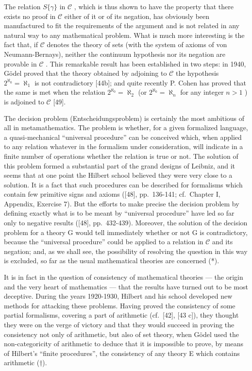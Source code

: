 The relation \(S\{\gamma\}\) in \(\mathcal{C}\) , which is thus shown to have the property that there exists no proof in \(\mathcal{C}\) either of it or of its negation, has obviously been manufactured to fit the requirements of the argument and is not related in any natural way to any mathematical problem. What is much more interesting is the fact that, if \(\mathcal{C}\) denotes the theory of sets (with the system of axioms of von Neumann-Bernays), neither the continuum hypothesis nor its negation are provable in \(\mathcal{C}\) . This remarkable result has been established in two steps: in 1940, Gödel proved that the theory obtained by adjoining to \(\mathcal{C}\) the hypothesis \(2^{\aleph_0} = \aleph_1\) is not contradictory {[}44b{]}; and quite recently P. Cohen has proved that the same is met when the relation \(2^{\aleph_0} = \aleph_2\) (or \(2^{\aleph_0} = \aleph_n\) for any integer \(n > 1\) ) is adjoined to \(\mathcal{C}\) {[}49{]}.

The decision problem (Entscheidungsproblem) is certainly the most ambitious of all in metamathematics. The problem is whether, for a given formalized language, a quasi-mechanical ``universal procedure'' can be conceived which, when applied to any relation whatever in the formalism under consideration, will indicate in a finite number of operations whether the relation is true or not. The solution of this problem formed a substantial part of the grand designs of Leibniz, and it seems that at one point the Hilbert school believed they were very close to a solution. It is a fact that such procedures can be described for formalisms which contain few primitive signs and axioms ({[}48{]}, pp.~136-141; cf.~Chapter I, Appendix, Exercise 7). But the efforts to make precise the decision problem by defining exactly what is to be meant by ``universal procedure'' have led so far only to negative results ({[}48{]}, pp.~432-439). Moreover, the solution of the decision problem for a theory G would tell immediately whether or not G is contradictory, because the ``universal procedure'' could be applied to a relation in \(\mathcal{C}\) and its negation; and, as we shall see, the possibility of resolving the question in this way is excluded, so far as the usual mathematical theories are concerned (*).

It is in fact in the question of consistency of mathematical theories --- the origin and the very heart of mathematics --- that the results have turned out to be most deceptive. During the years 1920-1930, Hilbert and his school developed new methods for attacking these problems. Having proved the consistency of some partial formalisms, covering a part of arithmetic (cf.~{[}42{]}, {[}43 c{]}), they thought they were on the verge of victory and that they would succeed in proving the consistency not only of arithmetic, but also of set theory, when Gödel used the non-categoricity of arithmetic to deduce that it is impossible to prove, by means of Hilbert's ``finite procedures'', the consistency of any theory E which contains arithmetic (†).


